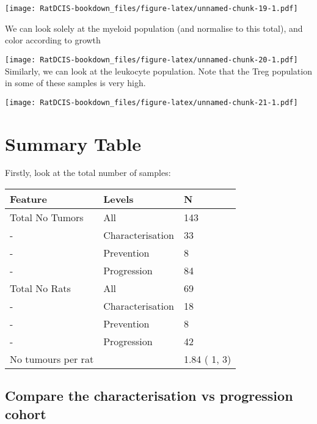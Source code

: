 \documentclass[
]{book}
\begin{document}
\texttt{[image: RatDCIS-bookdown\_files/figure-latex/unnamed-chunk-19-1.pdf]}

We can look solely at the myeloid population (and normalise to this total), and color according to growth

\texttt{[image: RatDCIS-bookdown\_files/figure-latex/unnamed-chunk-20-1.pdf]}
Similarly, we can look at the leukocyte population. Note that the Treg population in some of these samples is very high.

\texttt{[image: RatDCIS-bookdown\_files/figure-latex/unnamed-chunk-21-1.pdf]}

\hypertarget{summary-table}{%
\section{Summary Table}\label{summary-table}}

Firstly, look at the total number of samples:

\begin{longtable}[]{@{}lll@{}}
\toprule
Feature & Levels & N\tabularnewline
\midrule
\endhead
Total No Tumors & All & 143\tabularnewline
- & Characterisation & 33\tabularnewline
- & Prevention & 8\tabularnewline
- & Progression & 84\tabularnewline
Total No Rats & All & 69\tabularnewline
- & Characterisation & 18\tabularnewline
- & Prevention & 8\tabularnewline
- & Progression & 42\tabularnewline
No tumours per rat & & 1.84 ( 1, 3)\tabularnewline
\bottomrule
\end{longtable}

\hypertarget{compare-the-characterisation-vs-progression-cohort}{%
\subsection{Compare the characterisation vs progression cohort}\label{compare-the-characterisation-vs-progression-cohort}}
\end{document}
